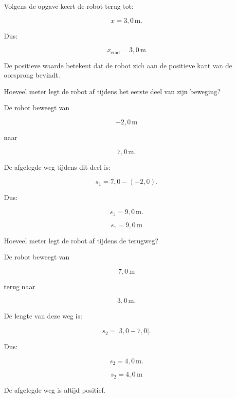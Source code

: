\documentclass{ximera}
\begin{document}
\begin{oefening}{\oefB\ESS}
\begin{question}
\begin{oplossing}
  Volgens de opgave keert de robot terug tot:
  
  \[
  x=3{,}0\,\mathrm{m}.
  \]
  
  Dus:
  
  \[
  \boxed{x_{\text{eind}}=3{,}0\,\mathrm{m}}
  \]
  
  De positieve waarde betekent dat de robot zich aan de positieve kant van de
  oorsprong bevindt.
  \end{oplossing}
  \end{question}
  
  
  \begin{question}
  Hoeveel meter legt de robot af tijdens het eerste deel van zijn beweging?
  
  \begin{oplossing}
  De robot beweegt van
  
  \[
  -2{,}0\,\mathrm{m}
  \]
  
  naar
  
  \[
  7{,}0\,\mathrm{m}.
  \]
  
  De afgelegde weg tijdens dit deel is:
  
  \[
  s_1
  =
  7{,}0-(-2{,}0).
  \]
  
  Dus:
  
  \[
  s_1=9{,}0\,\mathrm{m}.
  \]
  
  \[
  \boxed{s_1=9{,}0\,\mathrm{m}}
  \]
  \end{oplossing}
  \end{question}
  
  
  \begin{question}
  Hoeveel meter legt de robot af tijdens de terugweg?
  
  \begin{oplossing}
  De robot beweegt van
  
  \[
  7{,}0\,\mathrm{m}
  \]
  
  terug naar
  
  \[
  3{,}0\,\mathrm{m}.
  \]
  
  De lengte van deze weg is:
  
  \[
  s_2
  =
  |3{,}0-7{,}0|.
  \]
  
  Dus:
  
  \[
  s_2=4{,}0\,\mathrm{m}.
  \]
  
  \[
  \boxed{s_2=4{,}0\,\mathrm{m}}
  \]
  
  De afgelegde weg is altijd positief.
  \end{oplossing}
  \end{question}
  

\end{oefening}
\end{document}
